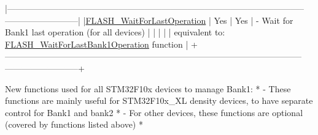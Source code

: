 \begin{DoxyCode}
  |--------------------------------------------------------------------------------------------------------
      --------------------------|
  |\hyperlink{group___f_l_a_s_h___exported___functions_ga2ad803999ae93ec03700983c59cae264}{FLASH\_WaitForLastOperation}          |    Yes     |      Yes      | - Wait \textcolor{keywordflow}{for} 
      Bank1 last operation (\textcolor{keywordflow}{for} all devices)              |
  |                                    |            |               |   equivalent to: 
      \hyperlink{group___f_l_a_s_h___exported___functions_ga470d345c2ea4304f899aa988bdd23824}{FLASH\_WaitForLastBank1Operation} \textcolor{keyword}{function}      |
  +--------------------------------------------------------------------------------------------------------
      --------------------------+

                                                                                                           
                     
    New functions used \textcolor{keywordflow}{for} all STM32F10x devices to manage Bank1:                                          
                    *
      - These functions are mainly useful \textcolor{keywordflow}{for} STM32F10x\_XL density devices, to have separate control \textcolor{keywordflow}{for} 
      Bank1 and bank2 *
      - For other devices, these functions are optional (covered by functions listed above)                
                    *
                                                                                                           

\end{DoxyCode}
